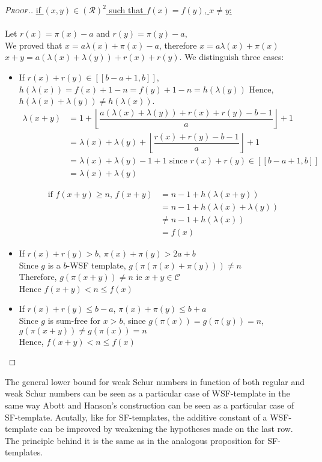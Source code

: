 \begin{proof}[\textsc{Proof.}]
\underline{if \((x,y) \in (\mathcal{R})^2\) such that \(f(x)=f(y)\), \(x \neq y\):}\\
\\Let \(r(x)=\pi(x)-a\) and \(r(y)=\pi(y)-a\),
\\We proved that \(x=a\lambda(x)+\pi(x)-a\), therefore \(x=a\lambda(x)+\pi(x)\)
\\\(x+y=a(\lambda(x)+\lambda(y))+r(x)+r(y)\). We distinguish three cases:

\begin{itemize}
\item If \(r(x)+r(y) \in [\![b-a+1,b]\!]\), \(h(\lambda(x))=f(x)+1-n=f(y)+1-n=h(\lambda(y))\)
Hence, \(h(\lambda(x)+\lambda(y)) \neq h(\lambda(x))\).
\begin{align*}
 \lambda(x+y) & =1+\left\lfloor\dfrac{a(\lambda(x)+\lambda(y))+r(x)+r(y)-b-1}{a}\right\rfloor+1\\
& = \lambda(x)+\lambda(y)+\left\lfloor\dfrac{r(x)+r(y)-b-1}{a}\right\rfloor+1 \\
& = \lambda(x)+\lambda(y) -1 +1 \text{ since } r(x)+r(y) \in [\![b-a+1,b]\!] \\
& =\lambda(x)+\lambda(y)
\end{align*}


\begin{align*}
 \text{if \(f(x+y) \geqslant n\), }f(x+y) & =n-1+h(\lambda(x+y))\\
& =n-1+h(\lambda(x)+\lambda(y)) \\
& \neq n-1+h(\lambda(x))\\
& =f(x)
\end{align*}


\item If \(r(x)+r(y)>b\), \(\pi(x)+\pi(y)>2a+b\)
\\Since \(g\) is a \(b\)-WSF template, \(g(\pi(\pi(x)+\pi(y))) \neq n\)
\\Therefore, \(g(\pi(x+y)) \neq n\) ie \(x+y \in \mathcal{C}\)
\\Hence \(f(x+y) <n\leqslant f(x)\)
\item If \(r(x)+r(y) \leqslant b - a\), \(\pi(x)+\pi(y)\leqslant b+a\)
\\Since \(g\) is sum-free for \(x>b\), since \(g(\pi(x)) = g(\pi(y))=n\), \(g(\pi(x+y)) \neq g(\pi(x))=n\)
\\Hence, \(f(x+y) <n\leqslant f(x)\)
\end{itemize}
\end{proof}

The general lower bound for weak Schur numbers in function of both regular and weak Schur numbers can be seen as a particular
case of WSF-template in the same way Abott and Hanson's construction can be seen as a particular case of SF-template. Acutally,
like for SF-templates, the additive constant of a WSF-template can be improved by weakening the hypotheses made on
the last row. The principle behind it is the same as in the analogous proposition for SF-templates.

